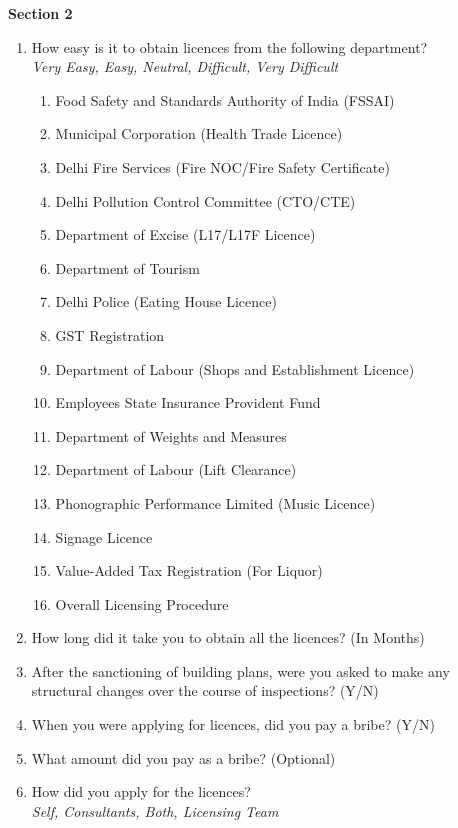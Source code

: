 \documentclass[a4paper, 12pt, twoside]{article}
\begin{document}
\begin{mdframed}[backgroundcolor=gray!20]
	
\textbf{Section 2}	
		\begin {enumerate}[nosep]
		\item How easy is it to obtain licences from the following department?\\ 
		\textit{Very Easy, Easy, Neutral, Difficult, Very Difficult}
			\begin {enumerate}[nosep]
			\item Food Safety and Standards Authority of India (FSSAI)
			\item Municipal Corporation (Health Trade Licence)
			\item Delhi Fire Services (Fire NOC/Fire Safety Certificate)
			\item Delhi Pollution Control Committee (CTO/CTE)
			\item Department of Excise (L17/L17F Licence)
			\item Department of Tourism
			\item Delhi Police (Eating House Licence)
			\item GST Registration
			\item Department of Labour (Shops and Establishment Licence)
			\item Employees State Insurance Provident Fund
			\item Department of Weights and Measures
			\item Department of Labour (Lift Clearance)
			\item Phonographic Performance Limited (Music Licence)
			\item Signage Licence
			\item Value-Added Tax Registration (For Liquor)
			\item Overall Licensing Procedure
			\end {enumerate}
		\item How long did it take you to obtain all the licences? (In Months)
		\item After the sanctioning of building plans, were you asked to make any structural changes over the course of inspections? (Y/N)
		\item When you were applying for licences, did you pay a bribe? (Y/N)
		\item What amount did you pay as a bribe? (Optional)
		\item How did you apply for the licences?\\
		\textit{Self, Consultants, Both, Licensing Team}
		\end {enumerate}
	

\end{mdframed}
\end{document}
